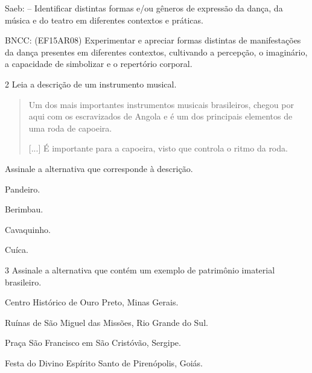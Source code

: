 \begin{escolha}
{Saeb: -- Identificar distintas formas e/ou gêneros de expressão da dança,
da música e do teatro em diferentes contextos e práticas.

BNCC: (EF15AR08) Experimentar e apreciar formas distintas de
manifestações da dança presentes em diferentes contextos, cultivando a
percepção, o imaginário, a capacidade de simbolizar e o repertório
corporal.}

\num{2}  Leia a descrição de um instrumento musical.

\begin{quote}
Um dos mais importantes instrumentos musicais brasileiros, chegou por
aqui com os escravizados de Angola e é um dos principais elementos de
uma roda de capoeira.

{[}...{]} É importante para a capoeira, visto que controla o ritmo da
roda.

\end{quote}

Assinale a alternativa que corresponde à descrição.

\begin{escolha}
\item
  Pandeiro.
\item
  Berimbau.
\item
  Cavaquinho.
\item
  Cuíca.
\end{escolha}


\num{3} Assinale a alternativa que contém um exemplo de patrimônio imaterial brasileiro.

\begin{escolha}
\item
  Centro Histórico de Ouro Preto, Minas Gerais.
\item
  Ruínas de São Miguel das Missões, Rio Grande do Sul.
\item
  Praça São Francisco em São Cristóvão, Sergipe.
\item
  Festa do Divino Espírito Santo de Pirenópolis, Goiás.
\end{escolha}


\end{escolha}
